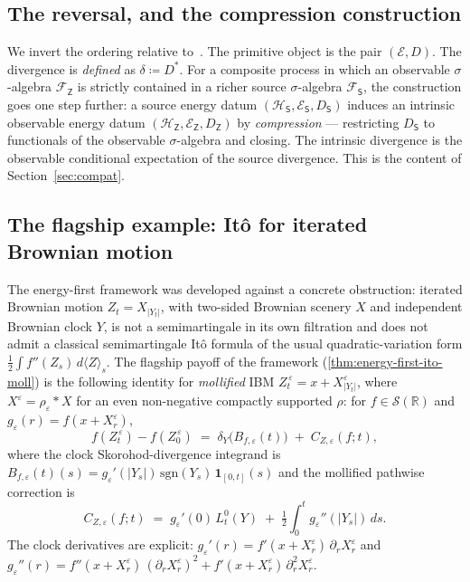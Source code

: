 \documentclass[11pt,reqno]{amsart}
\theoremstyle{plain}
\theoremstyle{definition}
\theoremstyle{remark}
\newcommand{\R}{\mathbb{R}}
\newcommand{\Hilb}{\mathcal{H}}
\newcommand{\Energy}{\mathcal{E}}
\newcommand{\Source}{\mathsf{S}}
\newcommand{\Obs}{\mathsf{Z}}
\newcommand{\IBM}{Z}
\begin{document}
\subsection*{The reversal, and the compression construction}
We invert the ordering relative to~\cite{Fontes-OperatorDerivative}. The
primitive object is the pair $(\Energy, D)$. The divergence is
\emph{defined} as $\delta\coloneqq D^{*}$. For a composite process in
which an observable $\sigma$-algebra $\mathcal F_\Obs$ is strictly
contained in a richer source $\sigma$-algebra $\mathcal F_\Source$, the
construction goes one step further: a source energy datum
$(\Hilb_\Source,\Energy_\Source,D_\Source)$ induces an intrinsic
observable energy datum $(\Hilb_\Obs,\Energy_\Obs,D_\Obs)$ by
\emph{compression} --- restricting $D_\Source$ to functionals of the
observable $\sigma$-algebra and closing. The intrinsic divergence is the
observable conditional expectation of the source divergence. This is the
content of Section~\ref{sec:compat}.

\subsection*{The flagship example: It\^o for iterated Brownian motion}
The energy-first framework was developed against a concrete
obstruction: iterated Brownian motion
$\IBM_t=X_{|Y_t|}$,
with two-sided Brownian scenery $X$ and independent Brownian clock
$Y$, is not a semimartingale in its own filtration and does not
admit a classical semimartingale It\^o formula of the usual
quadratic-variation form
$\tfrac12\!\int f''(\IBM_s)\,d\langle\IBM\rangle_s$. The flagship payoff of the framework
(\cref{thm:energy-first-ito-moll}) is the following identity for
\emph{mollified} IBM
$\IBM_t^{\,\varepsilon}=x+X^\varepsilon_{|Y_t|}$, where
$X^\varepsilon=\rho_\varepsilon*X$ for an even non-negative
compactly supported $\rho$: for $f\in\mathscr S(\R)$ and
$g_\varepsilon(r)=f(x+X^\varepsilon_r)$,
\begin{equation}\label{eq:flagship-intro}
  f(\IBM_t^{\,\varepsilon})-f(\IBM_0^{\,\varepsilon})
  \;=\;\delta_Y\bigl(B_{f,\varepsilon}(t)\bigr)
   \;+\;C_{\IBM,\varepsilon}(f;t),
\end{equation}
where the clock Skorohod-divergence integrand is
$B_{f,\varepsilon}(t)(s)=g_\varepsilon'(|Y_s|)\,\mathrm{sgn}(Y_s)\,
\mathbf 1_{[0,t]}(s)$ and the mollified pathwise correction is
\begin{equation}\label{eq:flagship-C-intro}
  C_{\IBM,\varepsilon}(f;t)
   \;=\;g_\varepsilon'(0)\,L_t^{0}(Y)
   \;+\;\tfrac{1}{2}\int_0^{t}g_\varepsilon''(|Y_s|)\,ds.
\end{equation}
The clock derivatives are explicit:
$g_\varepsilon'(r)=f'(x+X^\varepsilon_r)\,\partial_r X^\varepsilon_r$
and
$g_\varepsilon''(r)=f''(x+X^\varepsilon_r)\,
(\partial_r X^\varepsilon_r)^{2}
+f'(x+X^\varepsilon_r)\,\partial_r^{2}X^\varepsilon_r$.
\end{document}
